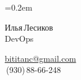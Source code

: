 \documentclass[11pt, a4paper]{article}
\newcommand\Eng[1]{%
  \foreignlanguage{english}{#1}%
}
\begin{document}
\sffamily

\font=0.2em


\newlength{\DelimitlineLength}
\setlength{\DelimitlineLength}{\textwidth+1em}

\pagecolor[RGB]{245,245,245}

{\setlength\multicolsep{0pt}%
\begin{multicols}{2}

\begin{spacing}{1.5}
  \rmfamily
  {\LARGE Илья\,Лесиков}\\
  {\Large\Eng{DevOps}}\hspace{1cm}{\large 25\,лет}
\end{spacing}

\columnbreak

\begin{flushright}
  \begin{spacing}{1.5}
    \rmfamily
    {\large\href{mailto:bititanc@gmail.com}{\Eng{bititanc@gmail.com}}}\\
    {\fontsize{1.4em}{0}\,(930)\,88-66-248} \normalsize\\
  \end{spacing}
\end{flushright}

\end{multicols}
}


\vspace{2ex}

\begin{comment}
У меня нет образования (неоконченный колледж электроники) и сомнительный стаж (10 месяцев сисадмином).\\
Но, самообучаясь, за последние пару лет я получил достаточный опыт и в общей автоматизации, и в \Eng{CI/CD}.\\
Получил некоторый опыт и в кодинге, как и хороший общий технический бэкграунд (\Eng{Linux}, сети и т.\,п.).
\end{comment}

\end{document}
